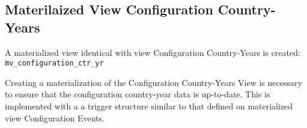 \subsection{Materilaized View Configuration Country-Years}\label{subsec_mview_configuration_ctr_yr}

A materialized view identical with view Configuration Country-Years is created: \texttt{mv\_configuration\_ctr\_yr}

Creating a materialization of the Configuration Country-Years View is necessary to ensure that the configuration country-year data is up-to-date. 
This is implemented with a a trigger structure similar to that defined on materialized view Configuration Events.

